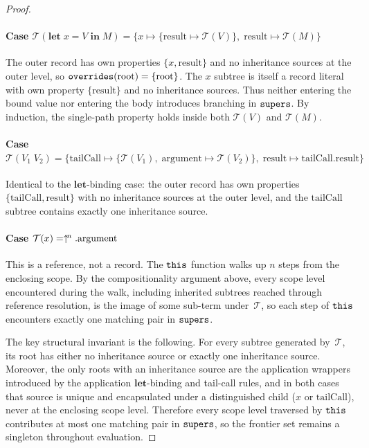 \begin{proof}
  \paragraph{Case
    $\mathcal{T}(\mathbf{let}\; x = V
    \;\mathbf{in}\; M)
    = \{x \mapsto \{\mathrm{result} \mapsto \mathcal{T}(V)\},\;
  \mathrm{result} \mapsto \mathcal{T}(M)\}$}
  The outer record has own properties $\{x, \mathrm{result}\}$
  and no inheritance sources at the outer level, so
  $\mathtt{overrides}(\text{root}) = \{\text{root}\}$.
  The $x$ subtree is itself a record literal with own
  property $\{\mathrm{result}\}$ and no inheritance
  sources.
  Thus neither entering the bound value nor entering the
  body introduces branching in $\mathtt{supers}$.
  By induction, the single-path property holds inside both
  $\mathcal{T}(V)$ and $\mathcal{T}(M)$.

  \paragraph{Case $\mathcal{T}(V_1\; V_2) =
    \{\mathrm{tailCall} \mapsto
      \{\mathcal{T}(V_1),\; \mathrm{argument} \mapsto
      \mathcal{T}(V_2)\},\;
      \mathrm{result} \mapsto
  \mathrm{tailCall}.\mathrm{result}\}$}
  Identical to the $\mathbf{let}$-binding case: the outer record
  has own properties $\{\mathrm{tailCall}, \mathrm{result}\}$
  with no inheritance sources at the outer level, and the
  $\mathrm{tailCall}$ subtree contains exactly one inheritance
  source.

  \paragraph{Case $\mathcal{T}(x)
  = \uparrow^{\!n}.\mathrm{argument}$}
  This is a reference, not a record.
  The $\mathtt{this}$ function walks up $n$ steps from the enclosing scope.
  By the compositionality argument above, every scope level
  encountered during the walk, including inherited subtrees
  reached through reference resolution, is the image of some
  sub-term under~$\mathcal{T}$, so each step of $\mathtt{this}$
  encounters exactly one matching pair in $\mathtt{supers}$.

  \medskip\noindent
  The key structural invariant is the following.
  For every subtree generated by~$\mathcal{T}$,
  its root has either no inheritance source or exactly one
  inheritance source.
  Moreover, the only roots with an inheritance source are the
  application wrappers introduced by the application
  $\mathbf{let}$-binding and tail-call rules, and in both cases
  that source is unique and encapsulated under a distinguished
  child ($x$ or $\mathrm{tailCall}$), never at the enclosing
  scope level.
  Therefore every scope level traversed by $\mathtt{this}$ contributes
  at most one matching pair in $\mathtt{supers}$, so the frontier set
  remains a singleton throughout evaluation.
\end{proof}


